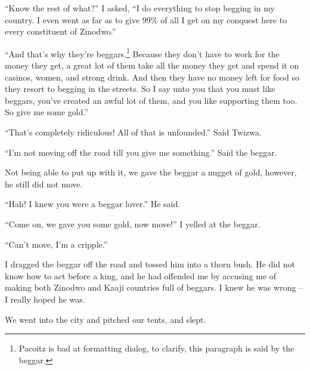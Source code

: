 ``Know the rest of what?'' I asked, ``I do everything to stop begging in my country. I even went as far as to give 99\% of all I get on my conquest here to every constituent of Zinodwo.''

``And that's why they're beggars.\footnote{Pacoitz is bad at formatting dialog, to clarify, this paragraph is said by the beggar.} Because they don't have to work for the money they get, a great lot of them take all the money they get and spend it on casinos, women, and strong drink. And then they have no money left for food so they resort to begging in the streets. So I say unto you that you must like beggars, you've created an awful lot of them, and you like supporting them too. So give me some gold.''

``That's completely ridiculous! All of that is unfounded.'' Said Twizwa.

``I'm not moving off the road till you give me something.'' Said the beggar.

Not being able to put up with it, we gave the beggar a nugget of gold, however, he still did not move.

``Hah! I knew you were a beggar lover.'' He said.

``Come on, we gave you some gold, now move!'' I yelled at the beggar.

``Can't move, I'm a cripple.''

I dragged the beggar off the road and tossed him into a thorn bush. He did not know how to act before a king, and he had offended me by accusing me of making both Zinodwo and Kaaji countries full of beggars. I knew he was wrong -- I really hoped he was.

We went into the city and pitched our tents, and slept.



